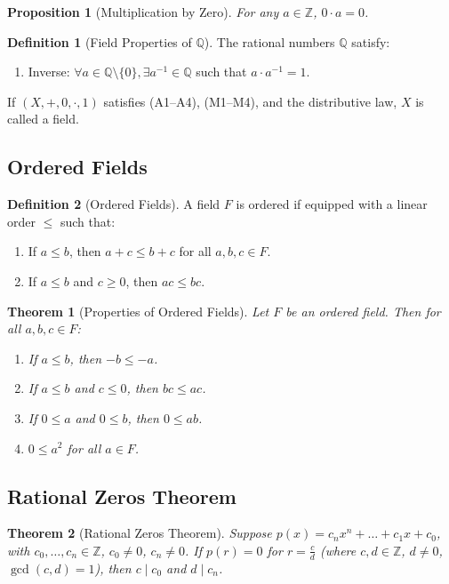 \documentclass[9pt]{article}
\theoremstyle{definition}
\newtheorem{definition}{Definition}
\theoremstyle{plain}
\newtheorem{theorem}{Theorem}
\newtheorem{proposition}{Proposition}
\begin{document}
\begin{proposition}[Multiplication by Zero]
For any $ a \in \mathbb{Z} $, $ 0 \cdot a = 0 $.
\end{proposition}

\begin{definition}[Field Properties of $ \mathbb{Q} $]
The rational numbers $ \mathbb{Q} $ satisfy:
\begin{enumerate}[label=(M\arabic*), resume]
    \item {Inverse:} $ \forall a \in \mathbb{Q} \setminus \{0\}, \exists a^{-1} \in \mathbb{Q} $ such that $ a \cdot a^{-1} = 1 $.
\end{enumerate}
If $ (X, +, 0, \cdot, 1) $ satisfies (A1–A4), (M1–M4), and the distributive law, $ X $ is called a field.
\end{definition}

\subsection*{Ordered Fields}
\begin{definition}[Ordered Fields]
A field $ F $ is ordered if equipped with a linear order $ \leq $ such that:
\begin{enumerate}[label=(O\arabic*)]
    \item If $ a \leq b $, then $ a + c \leq b + c $ for all $ a, b, c \in F $.
    \item If $ a \leq b $ and $ c \geq 0 $, then $ ac \leq bc $.
\end{enumerate}
\end{definition}

\begin{theorem}[Properties of Ordered Fields]
Let $ F $ be an ordered field. Then for all $ a, b, c \in F $:
\begin{enumerate}[label=(\roman*)]
    \item If $ a \leq b $, then $ -b \leq -a $.
    \item If $ a \leq b $ and $ c \leq 0 $, then $ bc \leq ac $.
    \item If $ 0 \leq a $ and $ 0 \leq b $, then $ 0 \leq ab $.
    \item $ 0 \leq a^2 $ for all $ a \in F $.
\end{enumerate}
\end{theorem}

\subsection*{Rational Zeros Theorem}
\begin{theorem}[Rational Zeros Theorem]
Suppose $ p(x) = c_nx^n + \ldots + c_1x + c_0 $, with $ c_0, \ldots, c_n \in \mathbb{Z} $, $ c_0 \neq 0 $, $ c_n \neq 0 $. If $ p(r) = 0 $ for $ r = \frac{c}{d} $ (where $ c, d \in \mathbb{Z} $, $ d \neq 0 $, $ \gcd(c, d) = 1 $), then $ c \mid c_0 $ and $ d \mid c_n $.
\end{theorem}
\end{document}
